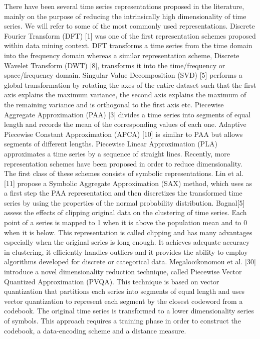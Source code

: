 \documentclass[12pt]{report}
\begin{document}
\begin{itemize}
There have been several time series representations proposed in the literature, mainly on the purpose of reducing the intrinsically high dimensionality of time series. We will refer to some of the most commonly used representations. Discrete Fourier Transform (DFT) [1] was one of the first representation schemes proposed within data mining context. DFT transforms a time series from the time domain into the frequency domain whereas a similar representation scheme, Discrete Wavelet Transform (DWT) [8], transforms it into the time/frequency or space/frequency domain. Singular Value Decomposition (SVD) [5] performs a global transformation by rotating the axes of the entire dataset such that the first axis explains the maximum variance, the second axis explains the maximum of the remaining variance and is orthogonal to the first axis etc. Piecewise Aggregate Approximation (PAA) [3] divides a time series into segments of equal length and records the mean of the corresponding values of each one. Adaptive Piecewise Constant Approximation (APCA) [10] is similar to PAA but allows segments of different lengths. Piecewise Linear Approximation (PLA) approximates a time series by a sequence of straight lines.
Recently, more representation schemes have been proposed in order to reduce dimensionality. The first class of these schemes consists of symbolic representations. Lin et al. [11] propose a Symbolic Aggregate Approximation (SAX) method, which uses as a first step the PAA representation and then discretizes the transformed time series by using the properties of the normal probability distribution. Bagnal[5] assess the effects of clipping original data on the clustering of time series. Each point of a series is mapped to 1 when it is above the population mean and to 0 when it is below. This representation is called clipping and has many advantages especially when the original series is long enough. It achieves adequate accuracy in clustering, it efficiently handles outliers and it provides the ability to employ algorithms developed for discrete or categorical data. Megalooikonomou et al. [30] introduce a novel dimensionality reduction technique, called Piecewise Vector Quantized Approximation (PVQA). This technique is based on vector quantization that partitions each series into segments of equal length and uses vector quantization to represent each segment by the closest codeword from a codebook. The original time series is transformed to a lower dimensionality series of symbols. This approach requires a training phase in order to construct the codebook, a data-encoding scheme and a distance measure.

\end{itemize}
\end{document}
